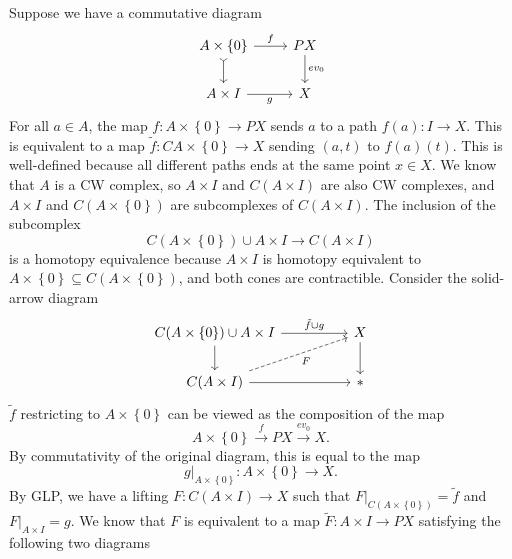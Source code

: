 \documentclass[letterpaper, 12pt]{article}
\begin{document}
\begin{solution}
Suppose we have a commutative diagram 
\[\begin{tikzcd}
	{A\times \left\{0\right\}} & PX \\
	{A\times I} & X
	\arrow["f", from=1-1, to=1-2]
	\arrow[tail, from=1-1, to=2-1]
	\arrow["{ev_0}", from=1-2, to=2-2]
	\arrow["g"', from=2-1, to=2-2]
\end{tikzcd}\]
For all \(a\in A\), the map \(f:A\times \left\{ 0 \right\}\rightarrow PX\) sends \(a\) to a path \(f(a):I\rightarrow X\). This is equivalent to a map \(\tilde{f}:CA\times \left\{ 0 \right\}\rightarrow X\) sending \((a,t)\) to \(f(a)(t)\). This is well-defined because all different paths ends at the same point \(x\in X\). We know that \(A\) is a CW complex, so \(A\times I\) and \(C(A\times I)\) are also CW complexes, and \(A\times I\) and \(C(A\times \left\{ 0 \right\})\) are subcomplexes of \(C(A\times I)\). The inclusion of the subcomplex
\[C(A\times \left\{ 0 \right\})\cup A\times I\rightarrow C(A\times I)\]
is a homotopy equivalence because \(A\times I\) is homotopy equivalent to \(A\times \left\{ 0 \right\}\subseteq C(A\times \left\{ 0 \right\})\), and both cones are contractible. 
Consider the solid-arrow diagram 
\[\begin{tikzcd}
	{C(A\times \left\{0\right\})\cup A\times I} && X \\
	{C(A\times I)} && {*}
	\arrow["{\tilde{f}\cup g}", from=1-1, to=1-3]
	\arrow[from=1-1, to=2-1]
	\arrow[from=1-3, to=2-3]
	\arrow["F"', dashed, from=2-1, to=1-3]
	\arrow[from=2-1, to=2-3]
\end{tikzcd}\]
\(\tilde{f}\) restricting to \(A\times \left\{ 0 \right\}\) can be viewed as the composition of the map 
\[A\times \left\{ 0 \right\}\xrightarrow{f}PX\xrightarrow{ev_0}X.\]
By commutativity of the original diagram, this is equal to the map 
\[g|_{A\times \left\{ 0 \right\}}:A\times \left\{ 0 \right\}\rightarrow X.\]
By GLP, we have a lifting \(F:C(A\times I)\rightarrow X\) such that \(F|_{C(A\times \left\{ 0 \right\})}=\tilde{f}\) and \(F|_{A\times I}=g\). We know that \(F\) is equivalent to a map \(\tilde{F}:A\times I\rightarrow PX\) satisfying the following two diagrams

\end{solution}
\end{document}
